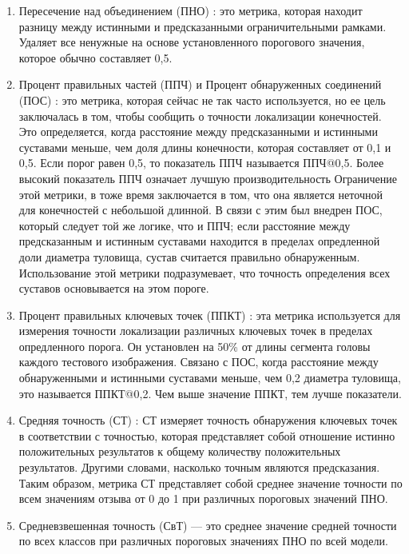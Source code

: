 \begin{enumerate}[label=\arabic*)]
	
	\item Пересечение над объединением (ПНО) \cite{IoU}: это метрика, которая находит разницу между истинными и предсказанными ограничительными рамками.
	Удаляет все ненужные на основе установленного порогового значения, которое обычно составляет 0,5.
	
	\item Процент правильных частей (ППЧ) и Процент обнаруженных соединений (ПОС) \cite{PDJ}: это метрика, которая сейчас не так часто используется, но ее цель заключалась в том, чтобы сообщить о точности локализации конечностей.
	Это определяется, когда расстояние между предсказанными и истинными суставами меньше, чем доля длины конечности, которая составляет от 0,1 и 0,5.
	Если порог равен 0,5, то показатель ППЧ называется ППЧ@0,5.
	Более высокий показатель ППЧ означает лучшую производительность
	Ограничение этой метрики, в тоже время заключается в том, что она является неточной для конечностей с небольшой длинной.
	В связи с этим был внедрен ПОС, который следует той же логике, что и ППЧ; если расстояние между предсказанным и истинным суставами находится в пределах опредленной доли диаметра туловища, сустав считается правильно обнаруженным.
	Использование этой метрики подразумевает, что точность определения всех суставов основывается на этом пороге.
	
	\item Процент правильных ключевых точек  (ППКТ) \cite{guide-hpe}: эта метрика используется для измерения точности локализации различных ключевых точек в пределах опредленного порога.
	Он установлен на 50\% от длины сегмента головы каждого тестового изображения.
	Связано с ПОС, когда расстояние между обнаруженными и истинными суставами меньше, чем 0,2 диаметра туловища, это называется ППКТ@0,2.
	Чем выше значение ППКТ, тем лучше показатели.
	
	\item Средняя точность (СТ) \cite{guide-hpe}: СТ измеряет точность обнаружения ключевых точек в соответствии с точностью, которая представляет собой отношение истинно положительных результатов к общему количеству положительных результатов.
	Другими словами, насколько точным являются предсказания. 
	Таким образом, метрика СТ представляет собой среднее значение точности по всем значениям отзыва от 0 до 1 при различных пороговых значений ПНО.
	
	\item Средневзвешенная точность (СвТ) \cite{guide-hpe} --- это среднее значение средней точности по всех классов при различных пороговых значениях ПНО по всей модели.
	

\end{enumerate}
